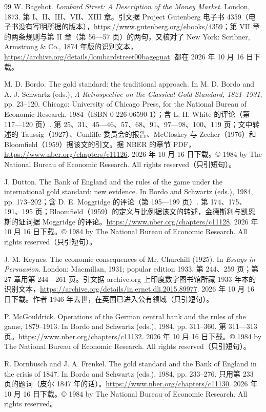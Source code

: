 \begin{thebibliography}{99}
 W. Bagehot. \emph{Lombard Street: A Description of the Money Market}. London, 1873. 第 I、II、III、VII、XIII 章。引文据 Project Gutenberg 电子书 4359（电子书没有写明所据的版本），\url{https://www.gutenberg.org/ebooks/4359}；第 VII 章的两条规则与第 II 章（第 56—57 页）的两句，又核对了 New York: Scribner, Armstrong \& Co., 1874 年版的识别文本，\url{https://archive.org/details/lombardstreet00bageguat}. 都在 2026 年 10 月 16 日下载。

 M. D. Bordo. The gold standard: the traditional approach. In M. D. Bordo and A. J. Schwartz (eds.), \emph{A Retrospective on the Classical Gold Standard, 1821--1931}, pp. 23--120. Chicago: University of Chicago Press, for the National Bureau of Economic Research, 1984（ISBN 0-226-06590-1）；含 L. H. White 的评论（第 117—120 页）. 第 25、31、45—46、57、68、91、97—98、100、119 页；文中转述的 Taussig（1927）、Cunliffe 委员会的报告、McCloskey 与 Zecher（1976）和 Bloomfield（1959）据该文的引文。据 NBER 的章节 PDF，\url{https://www.nber.org/chapters/c11126}. 2026 年 10 月 16 日下载。© 1984 by The National Bureau of Economic Research. All rights reserved（只引短句）。

 J. Dutton. The Bank of England and the rules of the game under the international gold standard: new evidence. In Bordo and Schwartz (eds.), 1984, pp. 173--202；含 D. E. Moggridge 的评论（第 195—199 页）. 第 174、175、191、195 页；Bloomfield（1959）的定义与比例据该文的转述，金德斯利与凯恩斯的证词据 Moggridge 的评论。\url{https://www.nber.org/chapters/c11128}. 2026 年 10 月 16 日下载。© 1984 by The National Bureau of Economic Research. All rights reserved（只引短句）。

 J. M. Keynes. The economic consequences of Mr. Churchill (1925). In \emph{Essays in Persuasion}. London: Macmillan, 1931; popular edition 1933. 第 244、259 页；第 27 章用第 244—261 页。引文据 archive.org 上印度数字图书馆所藏 1933 年本的识别文本，\url{https://archive.org/details/in.ernet.dli.2015.89977}. 2026 年 10 月 16 日下载。作者 1946 年去世，在英国已进入公有领域（只引短句）。

 P. McGouldrick. Operations of the German central bank and the rules of the game, 1879--1913. In Bordo and Schwartz (eds.), 1984, pp. 311--360. 第 311—313 页。\url{https://www.nber.org/chapters/c11132}. 2026 年 10 月 16 日下载。© 1984 by The National Bureau of Economic Research. All rights reserved（只引短句）。

 R. Dornbusch and J. A. Frenkel. The gold standard and the Bank of England in the crisis of 1847. In Bordo and Schwartz (eds.), 1984, pp. 233--276. 只用第 233 页的题词（皮尔 1847 年的话）。\url{https://www.nber.org/chapters/c11130}. 2026 年 10 月 16 日下载。© 1984 by The National Bureau of Economic Research. All rights reserved。


\end{thebibliography}
